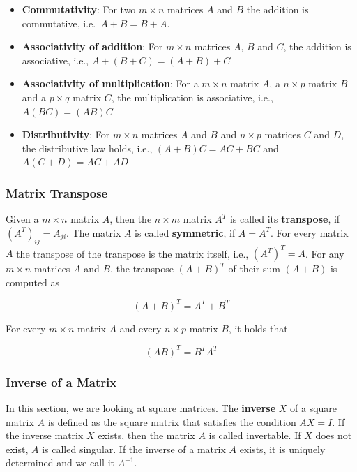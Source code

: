 \documentclass[
]{book}
\providecommand{\tightlist}{%
  \setlength{\itemsep}{0pt}\setlength{\parskip}{0pt}}
\theoremstyle{definition}
\theoremstyle{definition}
\theoremstyle{definition}
\theoremstyle{remark}
\begin{document}
\begin{itemize}
\tightlist
\item
  \textbf{Commutativity}: For two \(m\times n\) matrices \(A\) and \(B\) the addition is commutative, i.e.~\(A + B = B + A\).
\item
  \textbf{Associativity of addition}: For \(m\times n\) matrices \(A\), \(B\) and \(C\), the addition is associative, i.e., \(A + (B + C) = (A + B) + C\)
\item
  \textbf{Associativity of multiplication}: For a \(m\times n\) matrix \(A\), a \(n \times p\) matrix \(B\) and a \(p \times q\) matrix \(C\), the multiplication is associative, i.e., \(A(BC) = (AB)C\)
\item
  \textbf{Distributivity}: For \(m\times n\) matrices \(A\) and \(B\) and \(n\times p\) matrices \(C\) and \(D\), the distributive law holds, i.e., \((A+B)C = AC + BC\) and \(A(C + D) = AC + AD\)
\end{itemize}

\hypertarget{intro-linalg-laws-matrix-transpose}{%
\subsubsection{Matrix Transpose}\label{intro-linalg-laws-matrix-transpose}}

Given a \(m\times n\) matrix \(A\), then the \(n\times m\) matrix \(A^T\) is called its \textbf{transpose}, if \((A^T)_{ij} = A_{ji}\). The matrix \(A\) is called \textbf{symmetric}, if \(A = A^T\). For every matrix \(A\) the transpose of the transpose is the matrix itself, i.e., \((A^T)^T = A\). For any \(m\times n\) matrices \(A\) and \(B\), the transpose \((A+B)^T\) of their sum \((A+B)\) is computed as

\[(A+B)^T = A^T + B^T\]

For every \(m\times n\) matrix \(A\) and every \(n\times p\) matrix \(B\), it holds that

\[(AB)^T = B^T A^T\]

\hypertarget{intro-linalg-inverse-matrix}{%
\subsubsection{Inverse of a Matrix}\label{intro-linalg-inverse-matrix}}

In this section, we are looking at square matrices. The \textbf{inverse} \(X\) of a square matrix \(A\) is defined as the square matrix that satisfies the condition \(AX = I\). If the inverse matrix \(X\) exists, then the matrix \(A\) is called invertable. If \(X\) does not exist, \(A\) is called singular. If the inverse of a matrix \(A\) exists, it is uniquely determined and we call it \(A^{-1}\).
\end{document}
